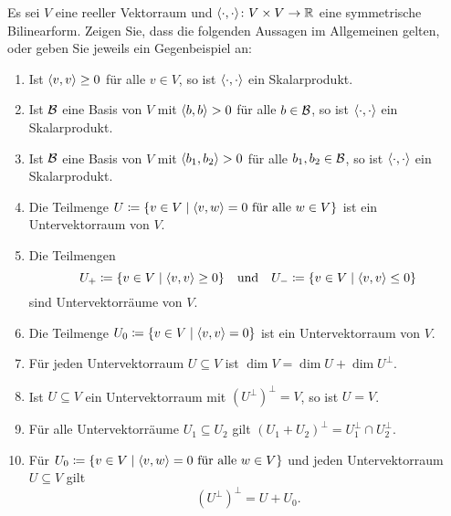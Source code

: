 \documentclass[a4paper,10pt]{scrartcl}
\begin{document}
\begin{question}
  Es sei $V$ eine reeller Vektorraum und $\langle \cdot, \cdot \rangle \colon V \times V \to \mathbb{R}$ eine symmetrische Bilinearform.
  Zeigen Sie, dass die folgenden Aussagen im Allgemeinen gelten, oder geben Sie jeweils ein Gegenbeispiel an:
  \begin{enumerate}[leftmargin=*]
    \item
      Ist $\langle v, v \rangle \geq 0$ für alle $v \in V$, so ist $\langle \cdot, \cdot \rangle$ ein Skalarprodukt.
    \item
      Ist $\mathcal{B}$ eine Basis von $V$ mit $\langle b, b \rangle > 0$ für alle $b \in \mathcal{B}$, so ist $\langle \cdot, \cdot \rangle$ ein Skalarprodukt.
    \item
      Ist $\mathcal{B}$ eine Basis von $V$ mit $\langle b_1, b_2 \rangle > 0$ für alle $b_1, b_2 \in \mathcal{B}$, so ist $\langle \cdot, \cdot \rangle$ ein Skalarprodukt.
    \item
      Die Teilmenge $U \coloneqq \{ v \in V \mid \text{$\langle v, w \rangle = 0$ für alle $w \in V$} \}$ ist ein Untervektorraum von $V$.
    \item
      Die Teilmengen
      \[
        U_+ \coloneqq \{ v \in V \mid \langle v, v \rangle \geq 0 \}
        \quad\text{und}\quad
        U_- \coloneqq \{ v \in V \mid \langle v, v \rangle \leq 0 \}
      \]
      sind Untervektorräume von $V$.
    \item
      Die Teilmenge $U_0 \coloneqq \{ v \in V \mid \langle v, v \rangle = 0 \}$ ist ein Untervektorraum von $V$.
    \item
      Für jeden Untervektorraum $U \subseteq V$ ist $\dim V = \dim U + \dim U^\perp$.
    \item
      Ist $U \subseteq V$ ein Untervektorraum mit $(U^\perp)^\perp = V$, so ist $U = V$.
    \item
      Für alle Untervektorräume $U_1 \subseteq U_2$ gilt $(U_1 + U_2)^\perp = U_1^\perp \cap U_2^\perp$.
    \item
      Für $U_0 \coloneqq \{ v \in V \mid \text{$\langle v, w \rangle = 0$ für alle $w \in V$} \}$ und jeden Untervektorraum $U \subseteq V$ gilt
      \[
        (U^\perp)^\perp = U + U_0.
      \]
  \end{enumerate}
\end{question}
\end{document}
